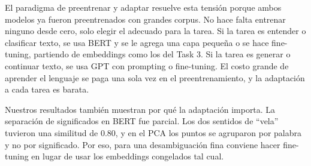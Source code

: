 \documentclass[11pt]{article}
\begin{document}
El paradigma de preentrenar y adaptar resuelve esta tensión porque ambos modelos ya fueron preentrenados con grandes corpus. No hace falta entrenar ninguno desde cero, solo elegir el adecuado para la tarea. Si la tarea es entender o clasificar texto, se usa BERT y se le agrega una capa pequeña o se hace fine-tuning, partiendo de embeddings como los del Task 3. Si la tarea es generar o continuar texto, se usa GPT con prompting o fine-tuning. El costo grande de aprender el lenguaje se paga una sola vez en el preentrenamiento, y la adaptación a cada tarea es barata.

Nuestros resultados también muestran por qué la adaptación importa. La separación de significados en BERT fue parcial. Los dos sentidos de ``vela'' tuvieron una similitud de 0.80, y en el PCA los puntos se agruparon por palabra y no por significado. Por eso, para una desambiguación fina conviene hacer fine-tuning en lugar de usar los embeddings congelados tal cual.
\end{document}
